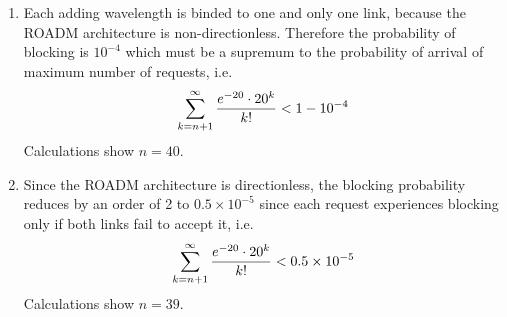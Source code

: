 \documentclass[10pt,letterpaper]{article}
\newcommand{\Q}[1]{\textbf{Question #1)}}
\newcommand{\nl}{\newline\newline}
\begin{document}
\begin{enumerate}[label=\alph*.]
\item
Each adding wavelength is binded to one and only one link, because the ROADM architecture is non-directionless. Therefore the probability of blocking is $10^{-4}$ which must be a supremum to the probability of arrival of maximum number of requests, i.e.
$$
\sum_{k=n+1}^{\infty} {e^{-20}\cdot20^k\over k!}< 1-10^{-4}
$$
Calculations show $n=40$.
\item
Since the ROADM architecture is directionless, the blocking probability reduces by an order of 2 to $0.5\times 10^{-5}$ since each request experiences blocking only if both links fail to accept it, i.e.
$$
\sum_{k=n+1}^{\infty} {e^{-20}\cdot20^k\over k!}< 0.5\times 10^{-5}
$$
Calculations show $n=39$.
\end{enumerate}


%
\end{document}
